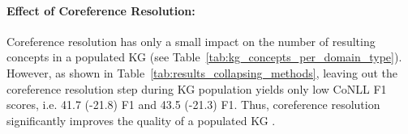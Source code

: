 \documentclass[runningheads]{llncs}
\begin{document}
\paragraph{Effect of Coreference Resolution:}
Coreference resolution has only a small impact on the number of resulting concepts in a populated KG (see Table~\ref{tab:kg_concepts_per_domain_type}).
However, as shown in Table~\ref{tab:results_collapsing_methods}, leaving out the coreference resolution step during KG population yields only low CoNLL F1 scores, i.e. 41.7 (-21.8) F1 and 43.5 (-21.3) F1. 
Thus, coreference resolution significantly improves the quality of a populated KG .


\begin{table}[tb]
\caption{Performance of the collapsing strategies evaluated against the \emph{Test-STM-KG}: in-domain and cross-domain collapsing  with and without coreference resolution.}
\label{tab:results_collapsing_methods}
\vspace{-1em}
\end{table}
\end{document}
